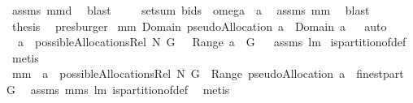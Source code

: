 \begin{isabellebody}
\ assms\ mm{}{}d\ \isamarkupfalse%
\ blast\isanewline
{}\isamarkupfalse%
\ \isamarkupfalse%
\ {\isachardoublequoteopen}{\isachardot}{\isachardot}{\isachardot}\ {\isacharequal}\ setsum\ bids\ {\isacharparenleft}{\isasymUnion}\ {\isacharparenleft}omega\ {\isacharbackquote}\ a{\isacharparenright}{\isacharparenright}{\isachardoublequoteclose}\ \isamarkupfalse%
\ assms\ mm{}{}\ \isamarkupfalse%
\ blast\isanewline
{}\isamarkupfalse%
\ \isamarkupfalse%
\ {\isacharquery}thesis\ \isamarkupfalse%
\ presburger\isanewline
{}\isamarkupfalse%
%
\endisatagproof
{\isafoldproof}%
%
\isadelimproof
\isanewline
%
\endisadelimproof
\isanewline
{}\isamarkupfalse%
\ mm{}{}{\isacharcolon}\ {\isachardoublequoteopen}Domain\ {\isacharparenleft}pseudoAllocation\ a{\isacharparenright}\ {\isasymsubseteq}\ Domain\ a{\isachardoublequoteclose}%
\isadelimproof
\ %
\endisadelimproof
%
\isatagproof
{}\isamarkupfalse%
\ auto%
\endisatagproof
{\isafoldproof}%
%
\isadelimproof
%
\endisadelimproof
\ \isanewline
{}\isamarkupfalse%
\ \ {\isachardoublequoteopen}a\ {\isasymin}\ possibleAllocationsRel\ N\ G{\isachardoublequoteclose}\ \ {\isachardoublequoteopen}{\isasymUnion}\ Range\ a\ {\isacharequal}\ G{\isachardoublequoteclose}%
\isadelimproof
\ %
\endisadelimproof
%
\isatagproof
{}\isamarkupfalse%
\ assms\ lm{}{}\ \isanewline
is{\isacharunderscore}partition{\isacharunderscore}of{\isacharunderscore}def\ \isamarkupfalse%
\ metis%
\endisatagproof
{\isafoldproof}%
%
\isadelimproof
%
\endisadelimproof
\isanewline
{}\isamarkupfalse%
\ mm{}{}{\isacharcolon}\ \ {\isachardoublequoteopen}a\ {\isasymin}\ possibleAllocationsRel\ N\ G{\isachardoublequoteclose}\ \ {\isachardoublequoteopen}Range\ {\isacharparenleft}pseudoAllocation\ a{\isacharparenright}\ {\isacharequal}\ finestpart\ G{\isachardoublequoteclose}\ \isanewline
%
\isadelimproof
%
\endisadelimproof
%
\isatagproof
{}\isamarkupfalse%
\ assms\ mm{}{}s\ lm{}{}\ is{\isacharunderscore}partition{\isacharunderscore}of{\isacharunderscore}def\ \isamarkupfalse%
\ metis%
\endisatagproof
{\isafoldproof}%
%
\isadelimproof
\isanewline
%
\endisadelimproof

\end{isabellebody}
